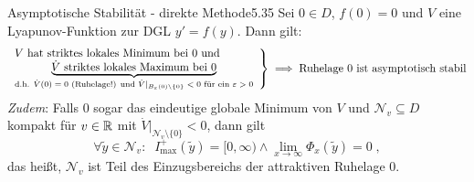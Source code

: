 \documentclass[a4paper]{article}
\begin{document}
\begin{Satz}{Asymptotische Stabilität - direkte Methode}{5.35}
Sei $0\in D$, $f(0)=0$ und $V$ eine Lyapunov-Funktion zur DGL $y'=f(y)$. Dann gilt:
\[\left.\begin{array}{l}
\text{$V$ hat striktes lokales Minimum bei $0$ und}\\
\underbrace{\text{$\dot{V}$ striktes lokales Maximum bei $0$}}_{\text{d.h. $\dot{V}(0)=0$ (Ruhelage!) und $\dot{V}|_{B_{\operatorname{\varepsilon}}(0)\setminus\{0\}}<0$ für ein $\operatorname{\varepsilon}>0$}}
\end{array}\right\}\implies \text{Ruhelage $0$ ist asymptotisch stabil}
\]
\textit{Zudem}: Falls 0 sogar das eindeutige globale Minimum von $V$ und $\mathcal{N}_v\subseteq D$ kompakt für $v\in\mathbb R$ mit $\dot{V}|_{\mathcal{N}_v\setminus\{0\}}<0$, dann gilt
\[\forall \tilde{y}\in\mathcal{N}_v:\;\;I_{\max}^+(\tilde{y})=[0,\infty)\wedge\lim_{x\to\infty}\Phi_x(\tilde{y})=0\;,\]
das heißt, $\mathcal{N}_v$ ist Teil des Einzugsbereichs der attraktiven Ruhelage 0.
\end{Satz}
\end{document}
